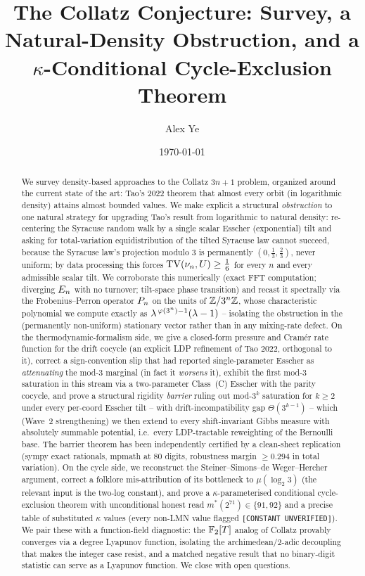 \documentclass[11pt]{amsart}
\title[Collatz: survey, six propositions]{The Collatz Conjecture: Survey, a Natural-Density Obstruction, and a $\kappa$-Conditional Cycle-Exclusion Theorem}
\author[A. Ye]{Alex Ye}
\date{\today}
\theoremstyle{definition}
\theoremstyle{remark}
\begin{document}
\begin{abstract}
We survey density-based approaches to the Collatz $3n+1$ problem, organized around the current
state of the art: Tao's 2022 theorem that almost every orbit (in logarithmic density) attains
almost bounded values. We make explicit a structural \emph{obstruction} to one natural strategy
for upgrading Tao's result from logarithmic to natural density: re-centering the Syracuse random
walk by a single scalar Esscher (exponential) tilt and asking for total-variation equidistribution
of the tilted Syracuse law cannot succeed, because the Syracuse law's projection modulo $3$ is
permanently $(0,\tfrac13,\tfrac23)$, never uniform; by data processing this forces
$\mathrm{TV}(\nu_n,U)\ge \tfrac16$ for every $n$ and every admissible scalar tilt. We corroborate this
numerically (exact FFT computation; diverging $E_n$ with no turnover; tilt-space phase
transition) and recast it spectrally via the Frobenius--Perron operator $P_n$ on the units of
$\mathbb{Z}/3^{n}\mathbb{Z}$, whose characteristic polynomial we compute exactly as
$\lambda^{\,\varphi(3^n)-1}(\lambda-1)$ -- isolating the obstruction in the (permanently non-uniform)
stationary vector rather than in any mixing-rate defect. On the thermodynamic-formalism side, we
give a closed-form pressure and Cram\'er rate function for the drift cocycle (an explicit LDP
refinement of Tao 2022, orthogonal to it), correct a sign-convention slip that had reported
single-parameter Esscher as \emph{attenuating} the mod-$3$ marginal (in fact it \emph{worsens} it),
exhibit the first mod-$3$ saturation in this stream via a two-parameter Class~(C) Esscher with the
parity cocycle, and prove a structural rigidity \emph{barrier} ruling out mod-$3^k$ saturation
for $k\ge2$ under every per-coord Esscher tilt -- with drift-incompatibility gap
$\Theta(3^{k-1})$ -- which (Wave~2 strengthening) we then extend to every shift-invariant Gibbs
measure with absolutely summable potential, i.e.\ every LDP-tractable reweighting of the
Bernoulli base. The barrier theorem has been independently certified by a clean-sheet replication
(sympy exact rationals, mpmath at $80$ digits, robustness margin $\ge 0.294$ in total variation).
On the cycle side, we reconstruct the Steiner--Simons--de Weger--Hercher argument, correct a
folklore mis-attribution of its bottleneck to $\mu(\log_2 3)$ (the relevant input is the two-log
constant), and prove a $\kappa$-parameterised conditional cycle-exclusion theorem with
unconditional honest read $m^*(2^{71})\in\{91,92\}$ and a precise table of substituted $\kappa$
values (every non-LMN value flagged \texttt{[CONSTANT UNVERIFIED]}). We pair these with a
function-field diagnostic: the $\mathbb{F}_2[T]$ analog of Collatz provably converges via a degree
Lyapunov function, isolating the archimedean/$2$-adic decoupling that makes the integer case
resist, and a matched negative result that no binary-digit statistic can serve as a Lyapunov
function. We close with open questions.
\end{abstract}
\end{document}
